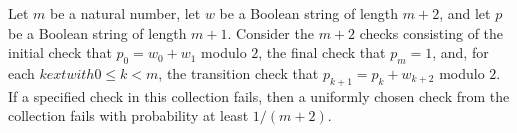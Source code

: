 \begin{theorem}
\label{FABL.one_div_length_le_failedCheckProbability}
\leanok
{}
Let $m$ be a natural number, let $w$ be a Boolean string of length $m+2$, and let $p$ be
a Boolean string of length $m+1$. Consider the $m+2$ checks consisting of the initial
check that $p_0=w_0+w_1$ modulo $2$, the final check that $p_m=1$, and, for each $k	ext{
with }0\le k<m$, the transition check that $p_{k+1}=p_k+w_{k+2}$ modulo $2$. If a
specified check in this collection fails, then a uniformly chosen check from the
collection fails with probability at least $1/(m+2)$.
\end{theorem}

